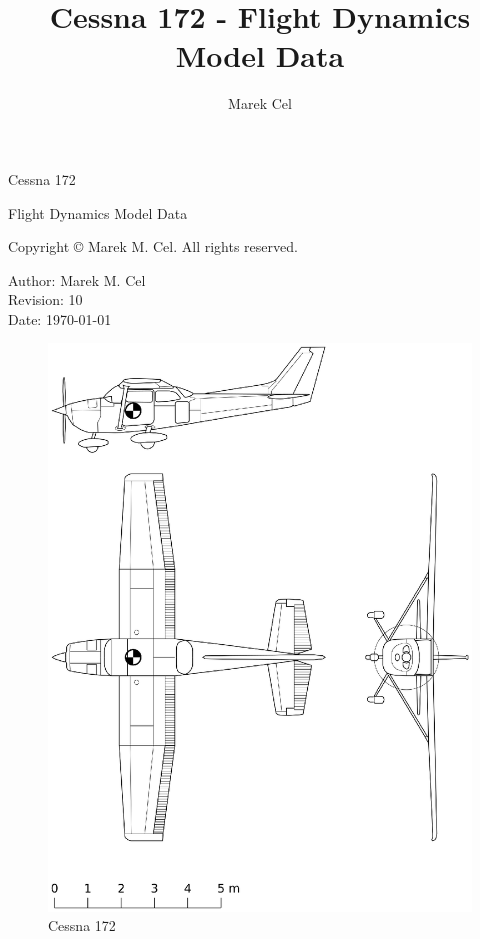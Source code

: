 \documentclass[12pt,a4paper]{article}
\title{Cessna 172 - Flight Dynamics Model Data}
\author{Marek Cel}
\date{}
\begin{document}
  
  \begin{titlepage}
    \centering
    {\huge Cessna 172 \par Flight Dynamics Model Data\par}
  \end{titlepage}
  

  \noindent Copyright \copyright{} \the\year{} Marek M. Cel. All rights reserved.

  \noindent Author: Marek M. Cel \\
  Revision: 10 \\
  Date: \today

  
  
  \clearpage
  \thispagestyle{empty}
  
  \begin{figure}[p]
    \centering
    \includegraphics[width=140mm]{eps/c172_3view.eps}
    \caption{Cessna 172}
  \end{figure}

  \restoregeometry

  {
    \clearpage
    \setlength{\parskip}{0em}
    \tableofcontents
  }

  
  
  
  
  
  \clearpage
   
  
  
\end{document}
